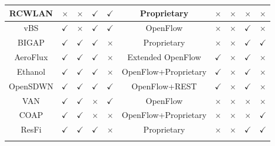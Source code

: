 \begin{table*}
\begin{tabular}{|c|c|c|c|c|c|c|c|c|c|}
		RCWLAN \cite{nakauchi2012airtime}&$\times$&$\times$&$\checkmark$&$\checkmark$& Proprietary &$\times$&$\times$&$\times$&$\times$\\\hline	
		vBS \cite{vBS}&$\checkmark$&$\times$&$\checkmark$&$\checkmark$& OpenFlow &$\times$&$\times$&$\checkmark$&$\times$\\\hline				
		BIGAP \cite{BIGAP}&$\checkmark$&$\checkmark$&$\checkmark$&$\times$& Proprietary &$\times$&$\times$&$\checkmark$&$\checkmark$\\\hline		
		AeroFlux \cite{AeroFlux}&$\checkmark$&$\checkmark$&$\checkmark$&$\times$& Extended OpenFlow &$\checkmark$&$\times$&$\checkmark$&$\times$\\\hline		
		Ethanol \cite{Ethanol}&$\checkmark$&$\checkmark$&$\checkmark$&$\times$& OpenFlow+Proprietary &$\checkmark$&$\times$&$\checkmark$&$\times$\\\hline
		OpenSDWN \cite{OpenSDWN}&$\checkmark$&$\checkmark$&$\checkmark$&$\checkmark$& OpenFlow+REST  &$\checkmark$&$\times$&$\checkmark$&$\times$\\\hline
		VAN \cite{VAN} &$\checkmark$&$\checkmark$&$\times$&$\checkmark$& OpenFlow &$\times$&$\times$&$\times$&$\times$\\\hline	
		COAP \cite{COAP}&$\checkmark$&$\checkmark$&$\times$&$\times$& OpenFlow+Proprietary  &$\times$&$\times$&$\times$&$\checkmark$\\\hline
		ResFi \cite{ResFi}&$\checkmark$&$\checkmark$&$\checkmark$&$\times$& Proprietary &$\times$&$\times$&$\checkmark$&$\checkmark$\\\Xhline{3\arrayrulewidth}		
	\end{tabular}
\end{table*}

%
%
%




